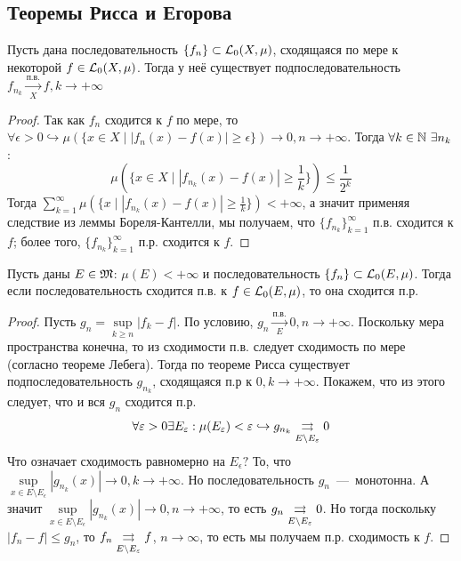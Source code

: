 \subsection{Теоремы Рисса и Егорова}
\begin{theorem}[Рисс]
    Пусть дана последовательность $\{f_n\} \subset \mathcal{L}_0(X, \mu)$, сходящаяся по мере к некоторой $f \in \mathcal{L}_0(X, \mu)$. Тогда у неё существует подпоследовательность $f_{n_k} \xrightarrow[X]{\text{п.в.}} f, k \rightarrow +\infty$
\end{theorem}
\begin{proof}
    Так как $f_n$ сходится к $f$ по мере, то $\forall \epsilon > 0 \hookrightarrow \mu(\{x \in X \mid |f_n(x) - f(x)| \geq \epsilon\}) \rightarrow 0, n \rightarrow +\infty$. Тогда $\forall k \in \mathbb{N} \  \exists n_k$: \[\mu\left(\{x \in X \mid |f_{n_k}(x) - f(x)| \geq \frac{1}{k}\}\right) \leq \frac{1}{2^k}\]
    Тогда $\sum\limits_{k = 1}^\infty \mu(\{x \mid |f_{n_k}(x) - f(x)| \geq \frac{1}{k}\}) < +\infty$, а значит применяя следствие из леммы Бореля-Кантелли, мы получаем, что $\{ f_{n_k} \}_{k = 1}^{\infty}$  п.в. сходится к $f$; более того, $\{ f_{n_k} \}_{k = 1}^{\infty}$ п.р. сходится к $f$.
\end{proof}

\begin{theorem}[Егоров]
    Пусть даны $E \in \mathfrak{M}$: $\mu(E) < +\infty$ и последовательность $\{f_n\} \subset \mathcal{L}_0(E, \mu)$. Тогда если последовательность сходится п.в. к $f \in \mathcal{L}_0(E, \mu)$, то она сходится п.р.
\end{theorem}
\begin{proof}
    Пусть $g_n  = \sup\limits_{k \geq n} |f_k - f|$. По условию, $g_n \xrightarrow[E]{\text{п.в.}} 0, n \rightarrow +\infty$. Поскольку мера пространства конечна, то из сходимости п.в. следует сходимость по мере (согласно теореме Лебега). Тогда по теореме Рисса существует подпоследовательность $g_{n_k}$, сходящаяся п.р к $0, k \rightarrow +\infty$. Покажем, что из этого следует, что и вся $g_n$ сходится п.р. \[\forall \varepsilon > 0 \exists E_{\varepsilon}: \mu(E_{\varepsilon}) < \varepsilon \hookrightarrow g_{n_k} \underset{E \setminus E_{\varepsilon}}{\rightrightarrows} 0\]
    Что означает сходимость равномерно на $E_\epsilon?$ То, что $\sup\limits_{x\in E \setminus E_\epsilon} |g_{n_k} (x)| \rightarrow 0, k \rightarrow +\infty$. Но последовательность $g_n$~---~монотонна. А значит $\sup\limits_{x\in E \setminus E_\epsilon} |g_{n_k} (x)| \rightarrow 0, n \rightarrow +\infty$, то есть $g_n \underset{E \setminus E_{\varepsilon}}{\rightrightarrows} 0$. Но тогда поскольку $|f_n - f| \leq g_n$, то $f_n \underset{E \setminus E_{\varepsilon}}{\rightrightarrows} f$, $n\to \infty$, то есть мы получаем п.р. сходимость к $f$.
\end{proof}

